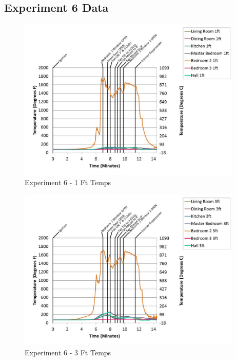 \documentclass{article}
\begin{document}
\begin{appendices}
		\clearpage
\clearpage		\large
\subsection{Experiment 6 Data} \label{App:Exp6Results} 

	\begin{figure}[h!]
		\centering
		\includegraphics[height=3.05in]{0_Images/Results_Charts/Exp_6_Charts/1FtTemps.pdf}
		\caption{Experiment 6 - 1 Ft Temps}
	\end{figure}
 

	\begin{figure}[h!]
		\centering
		\includegraphics[height=3.05in]{0_Images/Results_Charts/Exp_6_Charts/3FtTemps.pdf}
		\caption{Experiment 6 - 3 Ft Temps}
	\end{figure}
 
	\clearpage


\end{appendices}
\end{document}
